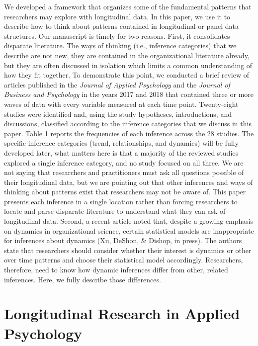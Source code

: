 \documentclass[english,,man]{apa6}
\theoremstyle{definition}
\theoremstyle{definition}
\theoremstyle{definition}
\theoremstyle{remark}
\begin{document}
We developed a framework that organizes some of the fundamental patterns
that researchers may explore with longitudinal data. In this paper, we
use it to describe how to think about patterns contained in longitudinal
or panel data structures. Our manuscript is timely for two reasons.
First, it consolidates disparate literature. The ways of thinking (i.e.,
inference categories) that we describe are not new, they are contained
in the organizational literature already, but they are often discussed
in isolation which limits a common understanding of how they fit
together. To demonstrate this point, we conducted a brief review of
articles published in the \emph{Journal of Applied Psychology} and the
\emph{Journal of Business and Psychology} in the years 2017 and 2018
that contained three or more waves of data with every variable measured
at each time point. Twenty-eight studies were identified and, using the
study hypotheses, introductions, and discussions, classified according
to the inference categories that we discuss in this paper. Table 1
reports the frequencies of each inference across the 28 studies. The
specific inference categories (trend, relationships, and dynamics) will
be fully developed later, what matters here is that a majority of the
reviewed studies explored a single inference category, and no study
focused on all three. We are not saying that researchers and
practitioners must ask all questions possible of their longitudinal
data, but we are pointing out that other inferences and ways of thinking
about patterns exist that researchers may not be aware of. This paper
presents each inference in a single location rather than forcing
researchers to locate and parse disparate literature to understand what
they can ask of longitudinal data. Second, a recent article noted that,
despite a growing emphasis on dynamics in organizational science,
certain statistical models are inappropriate for inferences about
dynamics (Xu, DeShon, \& Dishop, in press). The authors state that
researchers should consider whether their interest is dynamics or other
over time patterns and choose their statistical model accordingly.
Researchers, therefore, need to know how dynamic inferences differ from
other, related inferences. Here, we fully describe those differences.

\hypertarget{longitudinal-research-in-applied-psychology}{%
\section{Longitudinal Research in Applied
Psychology}\label{longitudinal-research-in-applied-psychology}}
\end{document}

